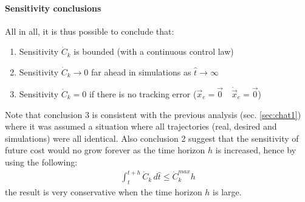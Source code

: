\paragraph{Sensitivity conclusions}
%
All in all, it is thus possible to conclude that:
\begin{enumerate}
	\item Sensitivity $\dot{C}_k$ is bounded (with a continuous control law)
	\item Sensitivity $\dot{C}_k \rightarrow 0$ far ahead in simulations as $\hat{t} \rightarrow \infty$
	\item Sensitivity $\dot{C}_k = 0$ if there is no tracking error ($ \vec{x}_e = \vec{0} \quad \dot{\vec{x}}_e = \vec{0}$)
\end{enumerate}
%
Note that conclusion 3 is consistent with the previous analysis (sec. \ref{sec:chat1}) where it was assumed a situation where all trajectories (real, desired and simulations) were all identical. Also conclusion 2 suggest that the sensitivity of future cost would no grow forever as the time horizon $h$ is increased, hence by using the following:
%
\begin{align}
\int_{t}^{t+h}{ \dot{C}_k \, d\hat{t} } \leq \dot{C}_k^{max} h
\end{align}
%
the result is very conservative when the time horizon $h$ is large.

